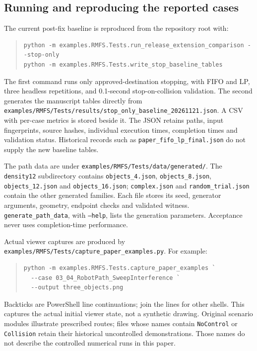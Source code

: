\documentclass[11pt,a4paper]{article}
\theoremstyle{remark}
\begin{document}
\subsection{Running and reproducing the reported cases}
The current post-fix baseline is reproduced from the repository root with:
\begin{quote}\small\begin{verbatim}
python -m examples.RMFS.Tests.run_release_extension_comparison --stop-only
python -m examples.RMFS.Tests.write_stop_baseline_tables
\end{verbatim}\end{quote}
The first command runs only approved-destination stopping, with FIFO and LP,
three headless repetitions, and 0.1-second stop-on-collision validation.
The second generates the manuscript tables directly from
\nolinkurl{examples/RMFS/Tests/results/stop_only_baseline_20261121.json}.
A CSV with per-case metrics is stored beside it. The JSON retains paths,
input fingerprints, source hashes, individual execution times, completion
times and validation status. Historical records such as
\nolinkurl{paper_fifo_lp_final.json} do not supply the new baseline tables.

The path data are under
\nolinkurl{examples/RMFS/Tests/data/generated/}. The \texttt{density12}
subdirectory contains \texttt{objects\_4.json}, \texttt{objects\_8.json},
\texttt{objects\_12.json} and \texttt{objects\_16.json}; \texttt{complex.json}
and \texttt{random\_trial.json} contain the other generated families.
Each file stores its seed, generator arguments, geometry, endpoint checks
and validated witness. \nolinkurl{generate_path_data}, with \texttt{--help}, lists the
generation parameters. Acceptance never uses completion-time performance.

Actual viewer captures are produced by
\nolinkurl{examples/RMFS/Tests/capture_paper_examples.py}. For example:
\begin{quote}\small\begin{verbatim}
python -m examples.RMFS.Tests.capture_paper_examples `
  --case 03_04_RobotPath_SweepInterference `
  --output three_objects.png
\end{verbatim}\end{quote}
Backticks are PowerShell line continuations; join the lines for other shells.
This captures the actual initial viewer state, not a synthetic drawing.
Original scenario modules illustrate prescribed routes; files whose names
contain \texttt{NoControl} or \texttt{Collision} retain their historical
uncontrolled demonstrations. Those names do not describe the controlled
numerical runs in this paper.
\end{document}
